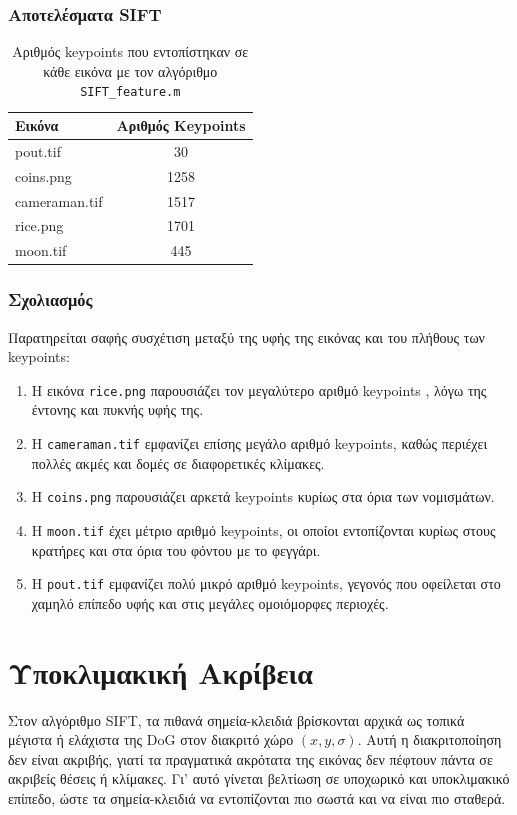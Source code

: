 \documentclass[12pt]{article}
\begin{document}
    
    \subsubsection{Αποτελέσματα SIFT}
    \begin{table}[h!]
      \centering
      \begin{tabular}{|l|c|}
      \hline
      \textbf{Εικόνα} & \textbf{Αριθμός Keypoints} \\
      \hline
      pout.tif & 30 \\
      coins.png & 1258 \\
      cameraman.tif & 1517 \\
      rice.png & 1701 \\
      moon.tif & 445 \\
      \hline
      \end{tabular}
      \caption{Αριθμός keypoints που εντοπίστηκαν σε κάθε εικόνα με τον αλγόριθμο \texttt{SIFT\_feature.m}}
      \end{table}
      
    
    \subsubsection{Σχολιασμός}
    Παρατηρείται σαφής συσχέτιση μεταξύ της υφής της εικόνας και του πλήθους των keypoints:

\begin{enumerate}
    \item Η εικόνα \texttt{rice.png} παρουσιάζει τον μεγαλύτερο αριθμό keypoints , λόγω της έντονης και πυκνής υφής της.
    \item Η \texttt{cameraman.tif} εμφανίζει επίσης μεγάλο αριθμό keypoints, καθώς περιέχει πολλές ακμές και δομές σε διαφορετικές κλίμακες.
    \item Η \texttt{coins.png} παρουσιάζει αρκετά keypoints κυρίως στα όρια των νομισμάτων.
    \item Η \texttt{moon.tif} έχει μέτριο αριθμό keypoints, οι οποίοι εντοπίζονται κυρίως στους κρατήρες και στα όρια του φόντου με το φεγγάρι.
    \item Η \texttt{pout.tif} εμφανίζει πολύ μικρό αριθμό keypoints, γεγονός που οφείλεται στο χαμηλό επίπεδο υφής και στις μεγάλες ομοιόμορφες περιοχές.
\end{enumerate}

    

\section{Υποκλιμακική Ακρίβεια}
Στον αλγόριθμο SIFT, τα πιθανά σημεία-κλειδιά βρίσκονται αρχικά ως τοπικά μέγιστα ή ελάχιστα της DoG στον διακριτό χώρο $(x,y,\sigma)$.
Αυτή η διακριτοποίηση δεν είναι ακριβής, γιατί τα πραγματικά ακρότατα της εικόνας δεν πέφτουν πάντα σε ακριβείς θέσεις ή κλίμακες.
Γι' αυτό γίνεται βελτίωση σε υποχωρικό και υποκλιμακικό επίπεδο, ώστε τα σημεία-κλειδιά να εντοπίζονται πιο σωστά και να είναι πιο σταθερά.
\end{document}
